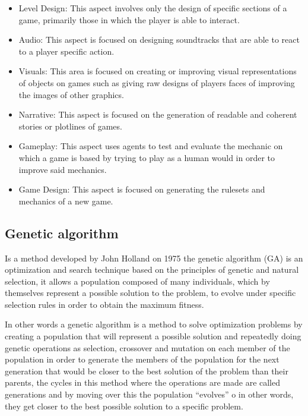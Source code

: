 \documentclass[conference]{IEEEtran}
\begin{document}
\begin{itemize}
    \item Level Design: This aspect involves only the design of specific
    sections of a game, primarily those in which the player is able to interact.
    \item Audio: This aspect is focused on designing soundtracks that are able
    to react to a player specific action.
    \item Visuals: This area is focused on creating or improving visual
    representations of objects on games such as giving raw designs of players
    faces of improving the images of other graphics.
    \item Narrative: This aspect is focused on the generation of readable and
    coherent stories or plotlines of games.
    \item Gameplay: This aspect uses agents to test and evaluate the mechanic on
    which a game is based by trying to play as a human would in order to improve
    said mechanics.
    \item Game Design: This aspect is focused on generating the rulesets and mechanics of a new game. \cite{Yannakakis2017,Smith2014,shaker2016procedural}
\end{itemize}

\subsection{Genetic algorithm}
Is a method developed by John Holland on 1975 \cite{Holland1975} the genetic
algorithm (GA) is an optimization and search technique based on the principles
of genetic and natural selection, it allows a population composed of many
individuals, which by themselves represent a possible solution to the problem,
to evolve under specific selection rules in order to obtain the maximum fitness.

In other words a genetic algorithm is a method to solve optimization problems by
creating a population that will represent a possible solution and repeatedly
doing genetic operations as selection, crossover and mutation on each member of
the population in order to generate the members of the population for the next
generation that would be closer to the best solution of the problem than their
parents, the cycles in this method where the operations are made are called
generations and by moving over this the population “evolves” o in other words,
they get closer to the best possible solution  to a specific problem.
\end{document}
